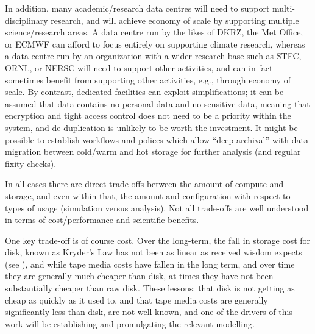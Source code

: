 In addition,  many academic/research data centres will need to support multi-disciplinary research, and will achieve economy of scale
by supporting multiple science/research areas.  A data centre run by the likes of DKRZ, the Met Office, or ECMWF can
afford to focus entirely on supporting climate research, whereas a data centre run by an organization with a wider
research base such as STFC, ORNL, or NERSC will need to support other activities, and can in fact sometimes benefit from supporting
other activities, e.g., through economy of scale.  By contrast, dedicated facilities can exploit simplifications; it can be assumed that
data contains no personal data and no sensitive data, meaning that encryption and tight access control does not need to be
 a priority within the system, and de-duplication is unlikely to be worth the investment. It might be  possible to establish workflows
 and polices which allow ``deep archival'' with data migration between cold/warm and hot storage for further analysis (and regular fixity checks).
 
In all cases there are direct trade-offs between the amount of compute and storage, and even within that, the amount and 
configuration with respect to types of usage (simulation versus analysis). 
Not all trade-offs are well understood in terms of cost/performance and scientific benefits.

One key trade-off is of course cost. Over the long-term, the fall in storage cost for disk, known as Kryder's Law has not been as linear as received wisdom expects 
(see ), and while tape media costs have fallen in the long term, and over time they are generally much cheaper than disk, at times they have not 
been substantially cheaper than raw disk. These lessons: that disk is not getting as cheap as quickly as it used to, and that tape media costs are generally 
significantly less than disk, are not well known, and one of the drivers of this work will be establishing and promulgating the relevant modelling.

%
%




